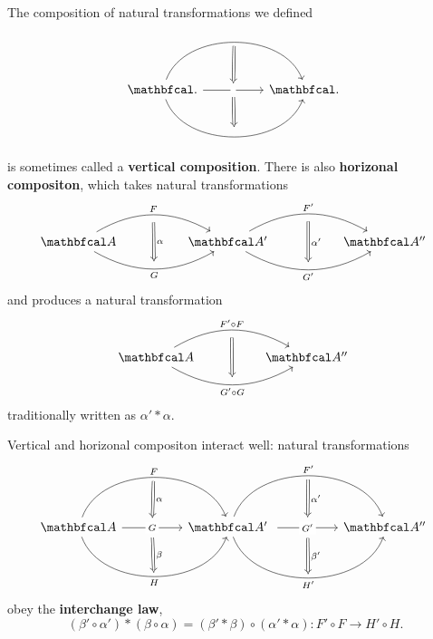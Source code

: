 The composition of natural transformations we defined
\begin{equation*}
\begin{tikzcd}
    \cat{.}
    \arrow[rr, bend left=70, ""{name=F}]
    \arrow{rr}[name=G, description]{}
    \arrow[rr, bend right=70, ""{name=H}]
    && \cat{.} \
    \arrow[Rightarrow, from=F, to=G, "", shorten <= 3pt, shorten >= 3pt]
    \arrow[Leftarrow, from=H, to=G, "", shorten <= 3pt, shorten >= 3pt]
\end{tikzcd}
\end{equation*}
is sometimes called a \textbf{vertical composition}. There is also \textbf{horizonal compositon}, which takes natural transformations
\begin{equation*}
\begin{tikzcd}
    \cat{A}
    \arrow[rr, bend left=30, "F"{name=F}]
    \arrow[rr, bend right=30, "G"'{name=G}]
    && \cat{A'} \
    \arrow[from=F, Rightarrow, to=G, "\alpha", shorten <= 6pt, shorten >= 6pt]
    \arrow[rr, bend left=30, "F'"{name=F'}]
    \arrow[rr, bend right=30, "G'"'{name=G'}]
    && \cat{A''} \
    \arrow[from=F', Rightarrow, to=G', "\alpha'", shorten <= 6pt, shorten >= 6pt]
\end{tikzcd}
\end{equation*}
and produces a natural transformation
\begin{equation*}
\begin{tikzcd}
    \cat{A}
    \arrow[rr, bend left=30, "F'\circ F"{name=F}]
    \arrow[rr, bend right=30, "G'\circ G"'{name=G}]
    && \cat{A''} \
    \arrow[from=F, Rightarrow, to=G, "", shorten <= 6pt, shorten >= 6pt]
\end{tikzcd}
\end{equation*}
traditionally written as $\alpha' * \alpha$.\par

Vertical and horizonal compositon interact well: natural transformations
\begin{equation*}
\begin{tikzcd}
    \cat{A}
    \arrow[rr, bend left=70, "F"{name=F}]
    \arrow{rr}[name=G, description]{G}
    \arrow[rr, bend right=70, "H"'{name=H}]
    && \cat{A'} \
    \arrow[rr, bend left=70, "F'"{name=F'}]
    \arrow{rr}[name=G', description]{G'}
    \arrow[rr, bend right=70, "H'"'{name=H'}]
    \arrow[Rightarrow, from=F, to=G, "\alpha", shorten <= 3pt, shorten >= 3pt]
    \arrow[Leftarrow, from=H, to=G, "\beta"', shorten <= 3pt, shorten >= 3pt]
    && \cat{A''} \
    \arrow[Rightarrow, from=F', to=G', "\alpha'", shorten <= 3pt, shorten >= 3pt]
    \arrow[Leftarrow, from=H', to=G', "\beta'"', shorten <= 3pt, shorten >= 3pt]
\end{tikzcd}
\end{equation*}
obey the \textbf{interchange law},
\begin{equation*}
    (\beta'\circ\alpha') * (\beta\circ\alpha) = (\beta'*\beta)\circ(\alpha'*\alpha): F'\circ F\to H'\circ H.
\end{equation*}
